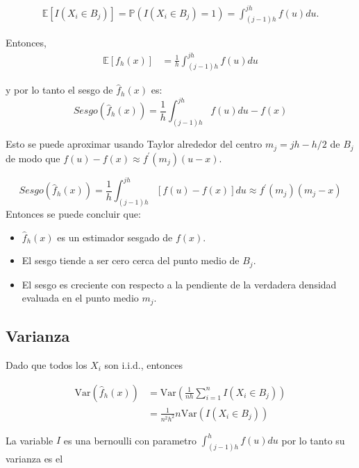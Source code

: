 \documentclass[
  12pt,
]{book}
\providecommand{\tightlist}{%
  \setlength{\itemsep}{0pt}\setlength{\parskip}{0pt}}
\begin{document}
\begin{align*}
\mathbb{E}\left[ I(X_i \in B_j)\right] = \mathbb{P}\left(I(X_i \in
B_j)=1\right) = \int_{(j - 1)h}^{jh} f(u)du.
\end{align*}

Entonces, \begin{align*}
\mathbb{E}\left[{f}_h(x)\right]
& = \frac{1}{h} \int_{(j - 1)h}^{jh} f(u)du
\end{align*}

y por lo tanto el sesgo de \(\hat f_h(x)\) es: \begin{equation*}
Sesgo(\hat{f}_h(x)) = \frac{1}{h} \int_{(j -
1)h}^{jh} f(u)du - f(x)
\end{equation*}

Esto se puede aproximar usando Taylor alrededor del centro
\(m_j = jh - h/2\) de \(B_j\) de modo que
\(f(u) - f(x) \approx f^{\prime}(m_j)(u - x)\).

\begin{equation*}
Sesgo(\hat{f}_h(x)) =  \frac{1}{h} \int_{(j -
1)h}^{jh} [f(u) - f(x)] du \approx f^\prime(m_j)(m_j - x)
\end{equation*} Entonces se puede concluir que:

\begin{itemize}
\tightlist
\item
  \(\hat f_h(x)\) es un estimador sesgado de \(f(x)\).
\item
  El sesgo tiende a ser cero cerca del punto medio de \(B_j\).
\item
  El sesgo es creciente con respecto a la pendiente de la verdadera
  densidad evaluada en el punto medio \(m_j\).
\end{itemize}

\hypertarget{varianza}{%
\subsection{Varianza}\label{varianza}}

Dado que todos los \(X_i\) son i.i.d., entonces

\begin{align*}
\mathrm{Var}\left( \hat{f}_h(x)\right) & =
\mathrm{Var}\left( \frac{1}{nh} \sum_{i = 1}^{n} I(X_i \in B_j)\right)                                  \\
& = \frac{1}{n^2h^2} n\mathrm{Var}\left( I(X_i \in B_j)\right)
\end{align*}

La variable \(I\) es una bernoulli con parametro
\(\int_{(j - 1)h}^{h} f(u)du\) por lo tanto su varianza es el
\end{document}
